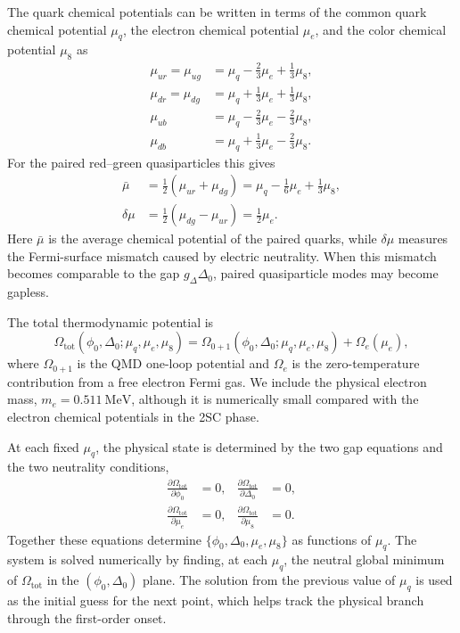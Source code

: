 The quark chemical potentials can be written in terms of the common quark
chemical potential \(\mu_q\), the electron chemical potential \(\mu_e\),
and the color chemical potential \(\mu_8\) as
\begin{align}
\mu_{ur} = \mu_{ug} &= \mu_q - \frac{2}{3}\mu_e + \frac{1}{3}\mu_8,
\\
\mu_{dr} = \mu_{dg} &= \mu_q + \frac{1}{3}\mu_e + \frac{1}{3}\mu_8,
\\
\mu_{ub} &= \mu_q - \frac{2}{3}\mu_e - \frac{2}{3}\mu_8,
\\
\mu_{db} &= \mu_q + \frac{1}{3}\mu_e - \frac{2}{3}\mu_8.
\end{align}
For the paired red--green quasiparticles this gives
\begin{align}
\bar{\mu}
&=
\frac{1}{2}(\mu_{ur}+\mu_{dg})
=
\mu_q-\frac{1}{6}\mu_e+\frac{1}{3}\mu_8,
\\
\delta\mu
&=
\frac{1}{2}(\mu_{dg}-\mu_{ur})
=
\frac{1}{2}\mu_e .
\end{align}
Here \(\bar{\mu}\) is the average chemical potential of the paired
quarks, while \(\delta\mu\) measures the Fermi-surface mismatch caused
by electric neutrality. When this mismatch becomes comparable to the gap
\(g_\Delta\Delta_0\), paired quasiparticle modes may become gapless.

The total thermodynamic potential is
\begin{equation}
\Omega_\mathrm{tot}(\phi_0,\Delta_0;\mu_q,\mu_e,\mu_8)
=
\Omega_{0+1}(\phi_0,\Delta_0;\mu_q,\mu_e,\mu_8)
+
\Omega_e(\mu_e),
\end{equation}
where \(\Omega_{0+1}\) is the QMD one-loop potential and
\(\Omega_e\) is the zero-temperature contribution from a free electron
Fermi gas. We include the physical electron mass,
\(m_e=0.511~\mathrm{MeV}\), although it is numerically small compared
with the electron chemical potentials in the 2SC phase.

At each fixed \(\mu_q\), the physical state is determined by the two gap
equations and the two neutrality conditions,
\begin{align}
\frac{\partial\Omega_\mathrm{tot}}{\partial\phi_0} &= 0,
&
\frac{\partial\Omega_\mathrm{tot}}{\partial\Delta_0} &= 0,
\label{eq:qmd_gap_equations_neutral}
\\
\frac{\partial\Omega_\mathrm{tot}}{\partial\mu_e} &= 0,
&
\frac{\partial\Omega_\mathrm{tot}}{\partial\mu_8} &= 0.
\label{eq:qmd_neutrality_conditions}
\end{align}
Together these equations determine
\(\{\phi_0,\Delta_0,\mu_e,\mu_8\}\) as functions of \(\mu_q\). The system
is solved numerically by finding, at each \(\mu_q\), the neutral global
minimum of \(\Omega_\mathrm{tot}\) in the \((\phi_0,\Delta_0)\) plane.
The solution from the previous value of \(\mu_q\) is used as the initial
guess for the next point, which helps track the physical branch through
the first-order onset.

